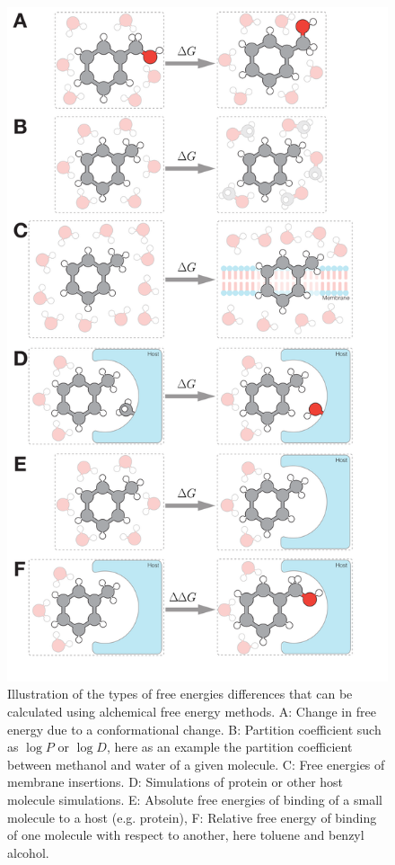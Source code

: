 \documentclass[9pt,bestpractices]{livecoms}
\begin{document}
\begin{figure}
    \includegraphics[width=0.95\linewidth]{paper/figures/fig1_what_is_alchemy/Fig1.pdf}    \caption{Illustration of the types of free energies differences that can be calculated using alchemical free energy methods. A: Change in free energy due to a conformational change. B: Partition coefficient such as $\log P$ or $\log D$, here as an example the partition coefficient between methanol and water of a given molecule. C: Free energies of membrane insertions. D: Simulations of protein or other host molecule simulations. E: Absolute free energies of binding of a small molecule to a host (e.g. protein), F: Relative free energy of binding of one molecule with respect to another, here toluene and benzyl alcohol.
    \label{fig:fig1_what_is_alchemy}
    }
\end{figure}
\end{document}
